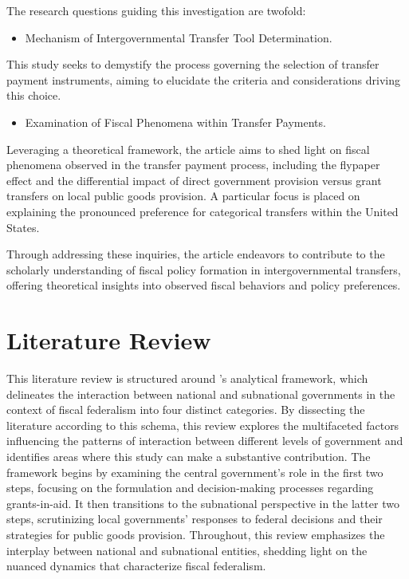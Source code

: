 The research questions guiding this investigation are twofold:
\begin{itemize}
    \item Mechanism of Intergovernmental Transfer Tool Determination.
\end{itemize}

This study seeks to demystify the process governing the selection of transfer payment instruments, aiming to elucidate the criteria and considerations driving this choice.

\begin{itemize}
    \item Examination of Fiscal Phenomena within Transfer Payments.
\end{itemize}

Leveraging a theoretical framework, the article aims to shed light on fiscal phenomena observed in the transfer payment process, including the flypaper effect and the differential impact of direct government provision versus grant transfers on local public goods provision. A particular focus is placed on explaining the pronounced preference for categorical transfers within the United States.

Through addressing these inquiries, the article endeavors to contribute to the scholarly understanding of fiscal policy formation in intergovernmental transfers, offering theoretical insights into observed fiscal behaviors and policy preferences.

\section{Literature Review}
This literature review is structured around \textcite{volden2007intergovernmental}'s analytical framework, which delineates the interaction between national and subnational governments in the context of fiscal federalism into four distinct categories. By dissecting the literature according to this schema, this review explores the multifaceted factors influencing the patterns of interaction between different levels of government and identifies areas where this study can make a substantive contribution. The framework begins by examining the central government's role in the first two steps, focusing on the formulation and decision-making processes regarding grants-in-aid. It then transitions to the subnational perspective in the latter two steps, scrutinizing local governments' responses to federal decisions and their strategies for public goods provision. Throughout, this review emphasizes the interplay between national and subnational entities, shedding light on the nuanced dynamics that characterize fiscal federalism.

